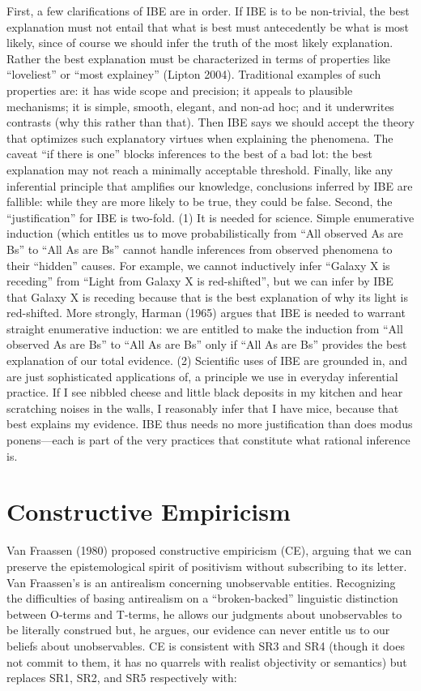 First, a few clarifications of IBE are in order. If IBE is to be non-trivial,
the best explanation must not entail that what is best must antecedently be what
is most likely, since of course we should infer the truth of the most likely
explanation. Rather the best explanation must be characterized in terms of
properties like “loveliest” or “most explainey” (Lipton 2004). Traditional
examples of such properties are: it has wide scope and precision; it appeals to
plausible mechanisms; it is simple, smooth, elegant, and non-ad hoc; and it
underwrites contrasts (why this rather than that). Then IBE says we should
accept the theory that optimizes such explanatory virtues when explaining the
phenomena. The caveat “if there is one” blocks inferences to the best of a bad
lot: the best explanation may not reach a minimally acceptable threshold.
Finally, like any inferential principle that amplifies our knowledge,
conclusions inferred by IBE are fallible: while they are more likely to be true,
they could be false. Second, the “justification” for IBE is two-fold. (1) It is
needed for science. Simple enumerative induction (which entitles us to move
probabilistically from “All observed As are Bs” to “All As are Bs” cannot handle
inferences from observed phenomena to their “hidden” causes. For example, we
cannot inductively infer “Galaxy X is receding” from “Light from Galaxy X is
red-shifted”, but we can infer by IBE that Galaxy X is receding because that is
the best explanation of why its light is red-shifted. More strongly, Harman
(1965) argues that IBE is needed to warrant straight enumerative induction: we
are entitled to make the induction from “All observed As are Bs” to “All As are
Bs” only if “All As are Bs” provides the best explanation of our total evidence.
(2) Scientific uses of IBE are grounded in, and are just sophisticated
applications of, a principle we use in everyday inferential practice. If I see
nibbled cheese and little black deposits in my kitchen and hear scratching
noises in the walls, I reasonably infer that I have mice, because that best
explains my evidence. IBE thus needs no more justification than does modus
ponens—each is part of the very practices that constitute what rational
inference is.


\section{Constructive Empiricism}

Van Fraassen (1980) proposed constructive empiricism (CE), arguing that we can
preserve the epistemological spirit of positivism without subscribing to its
letter. Van Fraassen’s is an antirealism concerning unobservable entities.
Recognizing the difficulties of basing antirealism on a “broken-backed”
linguistic distinction between O-terms and T-terms, he allows our judgments
about unobservables to be literally construed but, he argues, our evidence can
never entitle us to our beliefs about unobservables. CE is consistent with SR3
and SR4 (though it does not commit to them, it has no quarrels with realist
objectivity or semantics) but replaces SR1, SR2, and SR5 respectively with:

